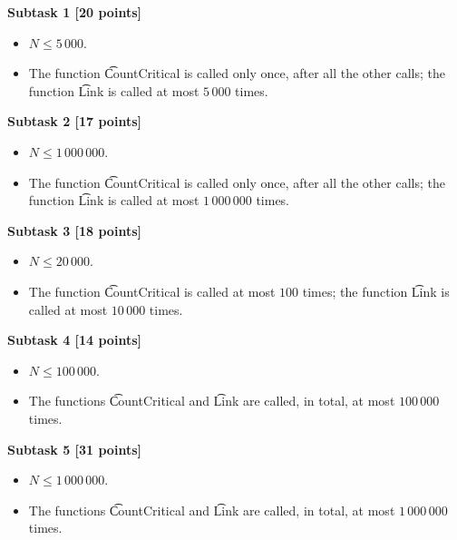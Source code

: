 \bf{Subtask 1 [20 points]}

\begin{itemize}
\item $N \le 5\,000$.
\item The function \t{CountCritical} is called only once, after all the other calls; the function \t{Link} is called at most $5\,000$ times.
\end{itemize}

\bf{Subtask 2 [17 points]}

\begin{itemize}
\item $N \le 1\,000\,000$.
\item The function \t{CountCritical} is called only once, after all the other calls; the function \t{Link} is called at most $1\,000\,000$ times.
\end{itemize}

\bf{Subtask 3 [18 points]}

\begin{itemize}
\item $N \le 20\,000$.
\item The function \t{CountCritical} is called at most $100$ times; the function \t{Link} is called at most $10\,000$ times.
\end{itemize}

\bf{Subtask 4 [14 points]}

\begin{itemize}
\item $N \le 100\,000$.
\item The functions \t{CountCritical} and \t{Link} are called, in total, at most $100\,000$ times.
\end{itemize}

\bf{Subtask 5 [31 points]}

\begin{itemize}
\item $N \le 1\,000\,000$.
\item The functions \t{CountCritical} and \t{Link} are called, in total, at most $1\,000\,000$ times.
\end{itemize}
